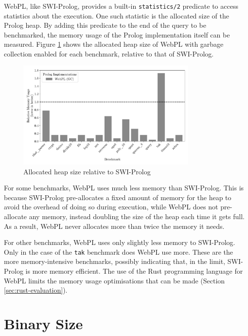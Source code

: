 \label{sec:prolog-heap-usage}

WebPL, like SWI-Prolog, provides a built-in \texttt{statistics/2} predicate to access statistics about the execution. One such statistic is the allocated size of the Prolog heap. By adding this predicate to the end of the query to be benchmarked, the memory usage of the Prolog implementation itself can be measured. Figure \ref{fig:heap-usage} shows the allocated heap size of WebPL with garbage collection enabled for each benchmark, relative to that of SWI-Prolog.

\begin{figure}[t]
\centering
\includegraphics[width=0.8\textwidth]{relative_memory_builtin.pdf}
\caption{Allocated heap size relative to SWI-Prolog}
\label{fig:heap-usage}
\end{figure}

For some benchmarks, WebPL uses much less memory than SWI-Prolog. This is because SWI-Prolog pre-allocates a fixed amount of memory for the heap to avoid the overhead of doing so during execution, while WebPL does not pre-allocate any memory, instead doubling the size of the heap each time it gets full. As a result, WebPL never allocates more than twice the memory it needs.

For other benchmarks, WebPL uses only slightly less memory to SWI-Prolog. Only in the case of the \texttt{tak} benchmark does WebPL use more. These are the more memory-intensive benchmarks, possibly indicating that, in the limit, SWI-Prolog is more memory efficient. The use of the Rust programming language for WebPL limits the memory usage optimisations that can be made (Section \ref{sec:rust-evaluation}).

\section{Binary Size}

